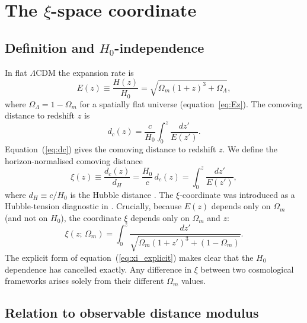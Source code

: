\documentclass[fleqn,usenatbib,useAMS]{mnras}
\begin{document}
\section{The $\xi$-space coordinate}
\label{sec:xi}

\subsection{Definition and $H_0$-independence}

In flat $\Lambda$CDM the expansion rate is
\begin{equation}
  E(z) \equiv \frac{H(z)}{H_0}
             = \sqrt{\Omega_m(1+z)^3 + \Omega_\Lambda},
  \label{eq:Ez}
\end{equation}
where $\Omega_\Lambda = 1 - \Omega_m$ for a spatially flat universe
\citep{hogg1999} (equation~\ref{eq:Ez}).
The comoving distance to redshift $z$ is \citep{hogg1999}
\begin{equation}
  d_c(z) = \frac{c}{H_0}\int_0^z \frac{dz'}{E(z')}.
  \label{eq:dc}
\end{equation}
Equation~(\ref{eq:dc}) gives the comoving distance to redshift $z$.
We define the horizon-normalised comoving distance
\begin{equation}
  \xi(z) \equiv \frac{d_c(z)}{d_H}
              = \frac{H_0}{c}\,d_c(z)
              = \int_0^z \frac{dz'}{E(z')},
  \label{eq:xi}
\end{equation}
where $d_H \equiv c/H_0$ is the Hubble distance \citep{hogg1999}.
The $\xi$-coordinate was introduced as a Hubble-tension diagnostic
in \citet{martin2026uha}.
Crucially, because $E(z)$ depends only on $\Omega_m$
(and not on $H_0$), the coordinate $\xi$ depends only on
$\Omega_m$ and $z$:
\begin{equation}
  \xi(z;\,\Omega_m) = \int_0^z \frac{dz'}%
    {\sqrt{\Omega_m(1+z')^3 + (1-\Omega_m)}}.
  \label{eq:xi_explicit}
\end{equation}
The explicit form of equation~(\ref{eq:xi_explicit}) makes clear that the $H_0$ dependence has cancelled exactly.
Any difference in $\xi$ between two cosmological frameworks
arises solely from their different $\Omega_m$ values.

\subsection{Relation to observable distance modulus}
\end{document}
